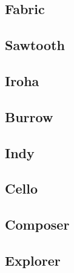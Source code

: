 \subsection{Fabric}


\subsection{Sawtooth}


\subsection{Iroha}


\subsection{Burrow}


\subsection{Indy}


\subsection{Cello}


\subsection{Composer}


\subsection{Explorer}
